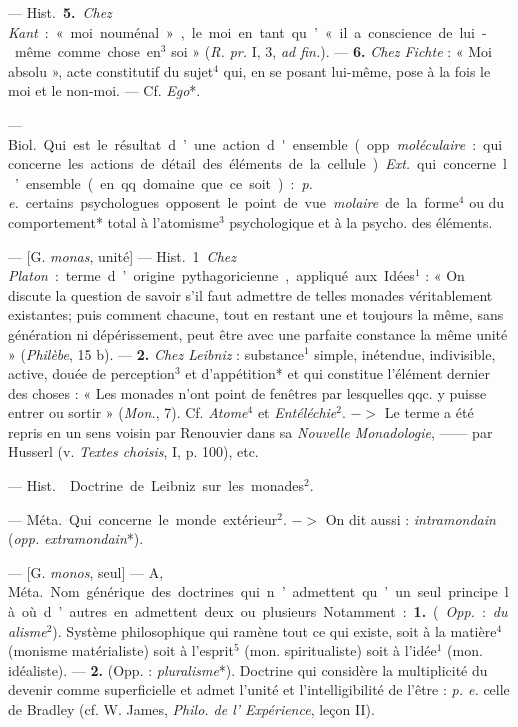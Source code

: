 \begin{itemize}[leftmargin=1cm, label=, itemsep=1pt]
— \si{Hist.} {\bf 5.} {\it Chez Kant} : « moi nouménal », le moi en tant
qu’ « il a conscience de lui-même comme chose en$^3$ soi » ({\it R. pr.} I,
3, {\it ad fin.}). —  {\bf 6.} {\it Chez Fichte} : « Moi absolu », acte
constitutif du sujet$^4$ qui, en se posant lui-même, pose à la fois le moi et
le non-moi. — Cf. {\it Ego}*.

 — \si{Biol.} Qui est le résultat d’une action d'ensemble (opp.
{\it moléculaire} : qui concerne les actions de détail des éléments de la
cellule). {\it Ext.} qui concerne l’ensemble (en qq. domaine que ce soit) :
{\it p. e.} certains psychologues opposent le point de vue {\it molaire} de
la forme$^4$ ou du comportement* total à l’atomisme$^3$ psychologique et à la
psycho. des éléments.

 — [G. {\it monas}, unité] — \si{Hist.} 1. {\it Chez Platon} :
terme d’origine pythagoricienne, appliqué . aux Idées$^1$ : « On discute la
question de savoir s’il faut admettre de telles monades véritablement
existantes; puis comment chacune, tout en restant une et toujours la même,
sans génération ni dépérissement, peut être avec une parfaite constance la
même unité » ({\it Philèbe}, 15 b). — {\bf 2.} {\it Chez Leibniz} :
substance$^1$ simple, inétendue, indivisible, active, douée de perception$^3$
et d’appétition* et qui constitue l'élément dernier des choses : « Les
monades n’ont point de fenêtres par lesquelles qqc. y puisse entrer ou
sortir » ({\it Mon.}, 7). Cf. {\it Atome}$^4$ et {\it Entéléchie}$^2$. $->$
Le terme a été repris en un sens voisin par Renouvier dans sa {\it Nouvelle
Monadologie}, —— par Husserl (v. {\it Textes choisis}, I, p. 100), etc.

 — \si{Hist.}  Doctrine de Leibniz sur les
monades$^2$.

 — \si{Méta.} Qui concerne le monde extérieur$^2$. $->$ On dit
aussi : {\it intramondain} ({\it opp.} {\it extramondain}*).

 — [G. {\it monos}, seul] — A, \si{Méta.} Nom générique des
doctrines qui n’admettent qu’un seul principe là où d’autres en admettent
deux ou plusieurs. Notamment : {\bf 1.} ({\it Opp.} : {\it dualisme}$^2$).
Système philosophique qui ramène tout ce qui existe, soit à la matière$^4$
(monisme matérialiste) soit à l’esprit$^5$ (mon. spiritualiste) soit à
l’idée$^1$ (mon. idéaliste). — {\bf 2.} (Opp. : {\it pluralisme}*). Doctrine
qui considère la multiplicité du devenir comme superficielle et admet l'unité
et l’intelligibilité de l’être : {\it p. e.} celle de Bradley (cf. W. James,
{\it Philo. de l’ Expérience}, leçon II).


\end{itemize}
